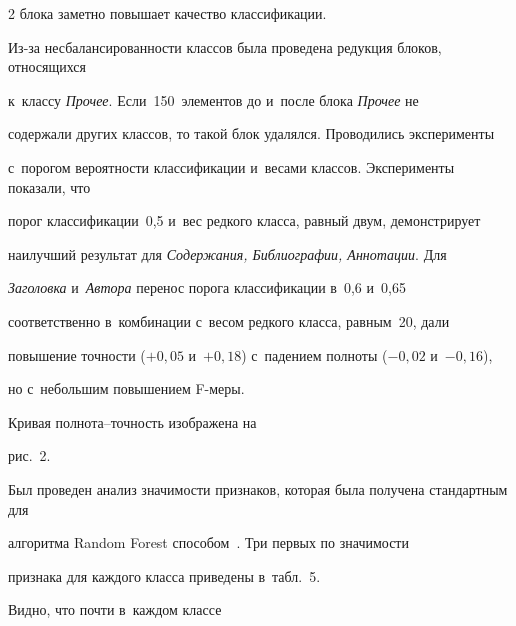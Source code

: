 \begin{multicols}{2}
блока заметно повышает качество классификации.





Из-за несбалансированности классов была проведена редукция блоков, относящихся 


к~классу \textit{Прочее}. Если~150~элементов до и~после блока \textit{Прочее} не 


содержали других классов, то такой блок удалялся. Проводились эксперименты 


с~порогом ве\-ро\-ят\-ности классификации и~весами классов. Эксперименты показали, что 


порог классификации~0,5 и~вес редкого класса, равный двум, демонстрирует 


наилучший результат для  \textit{Содержания, Библиографии, Аннотации}. Для 


\textit{Заголовка} и~\textit{Автора} перенос порога классификации в~0,6 и~0,65 


соответственно в~ком\-би\-на\-ции с~весом редкого класса, равным~20, дали 


повышение точ\-ности ($+0{,}05$ и~$+0{,}18$) с~падением пол\-но\-ты ($-0{,}02$ и~$-0{,}16$), 


но с~небольшим повышением F-ме\-ры. 


Кривая пол\-но\-та--точ\-ность изоб\-ра\-же\-на на 


рис.~2.





 























Был проведен анализ значимости признаков, которая была получена стандартным для 


алгоритма Random Forest способом~\cite{Breiman}. Три первых по значимости 


при\-зна\-ка для каж\-до\-го класса приведены в~табл.~5. 


Видно, что почти в~каждом классе\linebreak\vspace*{-12pt}






\end{multicols}
